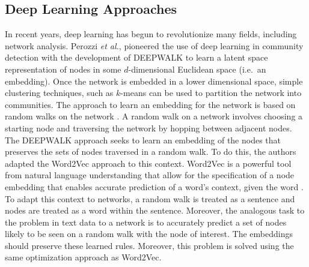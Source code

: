 \subsection{Deep Learning Approaches}
\indent In recent years, deep learning has begun to revolutionize many fields, including network analysis. Perozzi \emph{et al.}, pioneered the use of deep learning in community detection with the development of DEEPWALK \cite{deepWalk} to learn a latent space representation of nodes in some $d$-dimensional Euclidean space (i.e.~an embedding). Once the network is embedded in a lower dimensional space, simple clustering techniques, such as $k$-means \cite{kMean} can be used to partition the network into communities. The approach to learn an embedding for the network is based on random walks on the network \cite{rWalk,gleichpagerank}. A random walk on a network involves choosing a starting node and traversing the network by hopping between adjacent nodes. The DEEPWALK approach seeks to learn an embedding of the nodes that preserves the sets of nodes traversed in a random walk. To do this, the authors adapted the Word2Vec approach to this context. Word2Vec is a powerful tool from natural language understanding that allow for the specification of a node embedding that enables accurate prediction of a word's context, given the word \cite{word2Vec}. To adapt this context to networks, a random walk is treated as a sentence and nodes are treated as a word within the sentence. Moreover, the analogous task to the problem in text data to a network is to accurately predict a set of nodes likely to be seen on a random walk with the node of interest. The embeddings should preserve these learned rules. Moreover, this problem is solved using the same optimization approach as Word2Vec. \\
